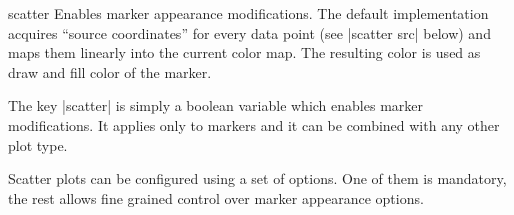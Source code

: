 \begin{plottype}{scatter}
	Enables marker appearance modifications. The default implementation acquires ``source coordinates'' for every data point (see |scatter src| below) and maps them linearly into the current color map. The resulting color is used as draw and fill color of the marker.

\begin{codeexample}[]
\end{codeexample}

	The key |scatter| is simply a boolean variable which enables marker modifications. It applies only to markers and it can be combined with any other plot type.

\begin{codeexample}[]
\end{codeexample}
\end{plottype}

Scatter plots can be configured using a set of options. One of them is mandatory, the rest allows fine grained control over marker appearance options.

